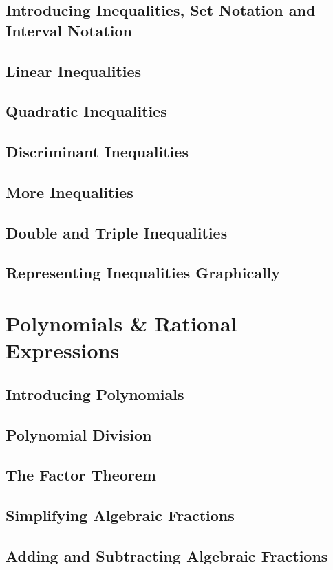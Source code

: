 \documentclass[../maths.tex]{subfiles}
\begin{document}
\subsection*{Introducing Inequalities, Set Notation and Interval Notation}
\subsection*{Linear Inequalities}
\subsection*{Quadratic Inequalities}
\subsection*{Discriminant Inequalities}
\subsection*{More Inequalities}
\subsection*{Double and Triple Inequalities}
\subsection*{Representing Inequalities Graphically}
\section{Polynomials \& Rational Expressions}
\subsection*{Introducing Polynomials}
\subsection*{Polynomial Division}
\subsection*{The Factor Theorem}
\subsection*{Simplifying Algebraic Fractions}
\subsection*{Adding and Subtracting Algebraic Fractions}
\end{document}
